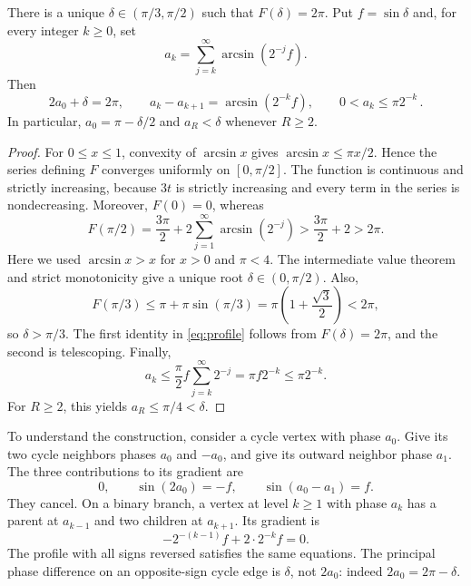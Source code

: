 \documentclass[11pt,reqno]{amsart}
\begin{document}
\begin{lem}\label{lem:profile}
There is a unique $\delta\in(\pi/3,\pi/2)$ such that $F(\delta)=2\pi$. Put $f=\sin\delta$ and, for every integer $k\ge0$, set
\[
    a_k=\sum_{j=k}^{\infty}\arcsin(2^{-j}f).
\]
Then
\begin{equation}\label{eq:profile}
    2a_0+\delta=2\pi,\qquad a_k-a_{k+1}=\arcsin(2^{-k}f),\qquad 0<a_k\le\pi 2^{-k} \,.
\end{equation}
In particular, $a_0=\pi-\delta/2$ and $a_R<\delta$ whenever $R\ge2$.
\end{lem}
\begin{proof}
For $0\le x\le1$, convexity of $\arcsin x$ gives $\arcsin x\le\pi x/2$. Hence the series defining $F$ converges uniformly on $[0,\pi/2]$. The function is continuous and strictly increasing, because $3t$ is strictly increasing and every term in the series is nondecreasing. Moreover, $F(0)=0$, whereas
\[
 F(\pi/2)=\frac{3\pi}{2}
       +2\sum_{j=1}^{\infty}\arcsin(2^{-j})
 >\frac{3\pi}{2}+2>2\pi.
\]
Here we used $\arcsin x>x$ for $x>0$ and $\pi<4$. The intermediate value theorem and strict monotonicity give a unique root $\delta\in(0,\pi/2)$.
Also,
\[
 F(\pi/3)
 \le \pi+\pi\sin(\pi/3)
 =\pi\left(1+\frac{\sqrt3}{2}\right)<2\pi,
\]
so $\delta>\pi/3$.
The first identity in \eqref{eq:profile} follows from $F(\delta)=2\pi$, and the second is telescoping. Finally,
\[
 a_k\le\frac\pi2 f\sum_{j=k}^{\infty}2^{-j}
 =\pi f2^{-k}\le\pi2^{-k}.
\]
For $R\ge2$, this yields $a_R\le\pi/4<\delta$.
\end{proof}
To understand the construction, consider a cycle vertex with phase $a_0$. Give its two cycle neighbors phases $a_0$ and $-a_0$, and give its outward neighbor phase $a_1$. The three contributions to its gradient are
\[
 0,\qquad \sin(2a_0)=-f,\qquad
 \sin(a_0-a_1)=f.
\]
They cancel. On a binary branch, a vertex at level $k\ge1$ with phase $a_k$ has a parent at $a_{k-1}$ and two children at $a_{k+1}$. Its gradient is
\[
 -2^{-(k-1)}f+2\cdot 2^{-k}f=0.
\]
The profile with all signs reversed satisfies the same equations. The principal phase difference on an opposite-sign cycle edge is $\delta$, not $2a_0$: indeed $2a_0=2\pi-\delta$. 
\end{document}
